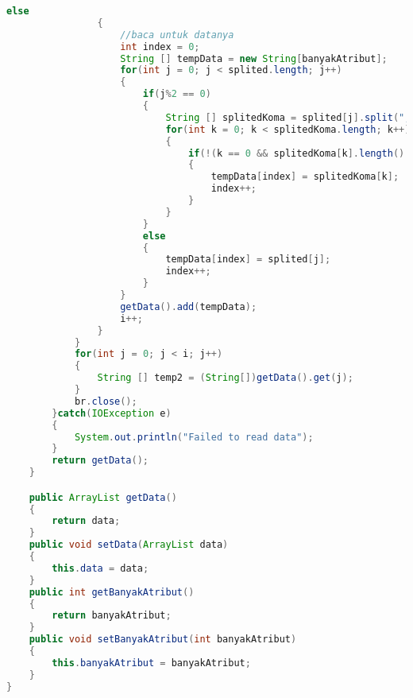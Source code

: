 \begin{lstlisting}[language=Java,basicstyle=\tiny,caption=CSVReader.java]
                else
                {
                    //baca untuk datanya
                    int index = 0;
                    String [] tempData = new String[banyakAtribut];
                    for(int j = 0; j < splited.length; j++)
                    {
                        if(j%2 == 0)
                        {
                            String [] splitedKoma = splited[j].split(",");
                            for(int k = 0; k < splitedKoma.length; k++)
                            {
                                if(!(k == 0 && splitedKoma[k].length() ==0)||(k==splitedKoma.length-1 && splitedKoma[k].length() == 0))
                                {
                                    tempData[index] = splitedKoma[k];
                                    index++;
                                }
                            }
                        }
                        else
                        {
                            tempData[index] = splited[j];
                            index++;
                        }
                    }
                    getData().add(tempData);
                    i++;
                }
            }
            for(int j = 0; j < i; j++)
            {
                String [] temp2 = (String[])getData().get(j);
            }
            br.close();
        }catch(IOException e)
        {
            System.out.println("Failed to read data");
        }
        return getData();
    }

    public ArrayList getData()
    {
        return data;
    }
    public void setData(ArrayList data)
    {
        this.data = data;
    }
    public int getBanyakAtribut()
    {
        return banyakAtribut;
    }
    public void setBanyakAtribut(int banyakAtribut)
    {
        this.banyakAtribut = banyakAtribut;
    }
}
\end{lstlisting}

